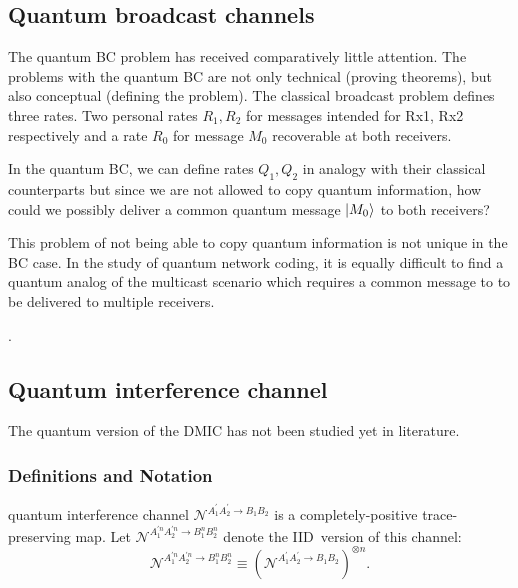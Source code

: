 \documentclass[aps,11pt,twoside,letterpaper]{article}
\begin{document}
		

	\subsection{Quantum broadcast channels}


		The quantum BC problem has received comparatively little attention.
		The problems with the quantum BC are not only technical (proving theorems), 
		but also conceptual (defining the problem).
		The classical broadcast problem defines three rates. 
		Two personal rates  $R_1,R_2$ for messages intended for Rx1, Rx2 respectively
		and a rate $R_0$ for message $M_0$ recoverable at both receivers.

		In the quantum BC, we can define rates $Q_1,Q_2$ in analogy with their
		classical counterparts but since we are not allowed to copy quantum information,
		how could we possibly deliver a common quantum message $| M_0 \rangle$ to both receivers?
		
		This problem of not being able to copy quantum information is not
		unique in the BC case. 
		In the study of quantum network coding, it is equally difficult to find a 
		quantum analog of the multicast scenario which requires a common message
		to to be delivered to multiple receivers.
		
		
		
		\cite{YHD2006}
		
		\cite{DH2006}.

		


	
	\subsection{Quantum interference channel}


		The quantum version of the DMIC has not been studied yet in literature. 


		\subsubsection{Definitions and Notation}

		quantum interference channel $\mathcal{N}^{A_{1}^{\prime}A_{2}^{\prime
		}\rightarrow B_{1}B_{2}}$ is a completely-positive trace-preserving map. Let
		$\mathcal{N}^{A_{1}^{\prime n}A_{2}^{\prime n}\rightarrow B_{1}^{n}B_{2}^{n}}$
		denote the IID\ version of this channel:%
		\[
		\mathcal{N}^{A_{1}^{\prime n}A_{2}^{\prime n}\rightarrow B_{1}^{n}B_{2}^{n}%
		}\equiv(\mathcal{N}^{A_{1}^{\prime}A_{2}^{\prime}\rightarrow B_{1}B_{2}%
		})^{\otimes n}.
		\]
\end{document}
